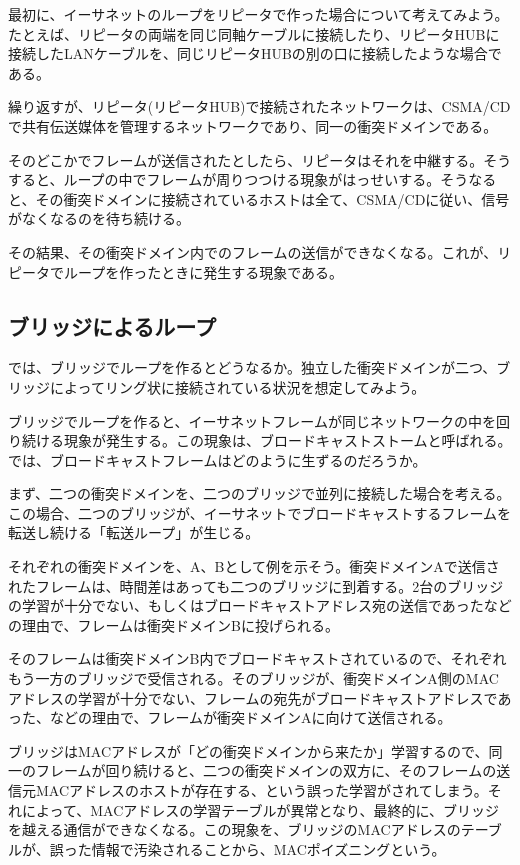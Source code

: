 最初に、イーサネットのループをリピータで作った場合について考えてみよう。たとえば、リピータの両端を同じ同軸ケーブルに接続したり、リピータHUBに接続したLANケーブルを、同じリピータHUBの別の口に接続したような場合である。

繰り返すが、リピータ(リピータHUB)で接続されたネットワークは、CSMA/CDで共有伝送媒体を管理するネットワークであり、同一の衝突ドメインである。

そのどこかでフレームが送信されたとしたら、リピータはそれを中継する。そうすると、ループの中でフレームが周りつつける現象がはっせいする。そうなると、その衝突ドメインに接続されているホストは全て、CSMA/CDに従い、信号がなくなるのを待ち続ける。

その結果、その衝突ドメイン内でのフレームの送信ができなくなる。これが、リピータでループを作ったときに発生する現象である。

\subsection{ブリッジによるループ}

では、ブリッジでループを作るとどうなるか。独立した衝突ドメインが二つ、ブリッジによってリング状に接続されている状況を想定してみよう。

ブリッジでループを作ると、イーサネットフレームが同じネットワークの中を回り続ける現象が発生する。この現象は、ブロードキャストストームと呼ばれる。では、ブロードキャストフレームはどのように生ずるのだろうか。

まず、二つの衝突ドメインを、二つのブリッジで並列に接続した場合を考える。この場合、二つのブリッジが、イーサネットでブロードキャストするフレームを転送し続ける「転送ループ」が生じる。

それぞれの衝突ドメインを、A、Bとして例を示そう。衝突ドメインAで送信されたフレームは、時間差はあっても二つのブリッジに到着する。2台のブリッジの学習が十分でない、もしくはブロードキャストアドレス宛の送信であったなどの理由で、フレームは衝突ドメインBに投げられる。

そのフレームは衝突ドメインB内でブロードキャストされているので、それぞれもう一方のブリッジで受信される。そのブリッジが、衝突ドメインA側のMACアドレスの学習が十分でない、フレームの宛先がブロードキャストアドレスであった、などの理由で、フレームが衝突ドメインAに向けて送信される。

ブリッジはMACアドレスが「どの衝突ドメインから来たか」学習するので、同一のフレームが回り続けると、二つの衝突ドメインの双方に、そのフレームの送信元MACアドレスのホストが存在する、という誤った学習がされてしまう。それによって、MACアドレスの学習テーブルが異常となり、最終的に、ブリッジを越える通信ができなくなる。この現象を、ブリッジのMACアドレスのテーブルが、誤った情報で汚染されることから、MACポイズニングという。

